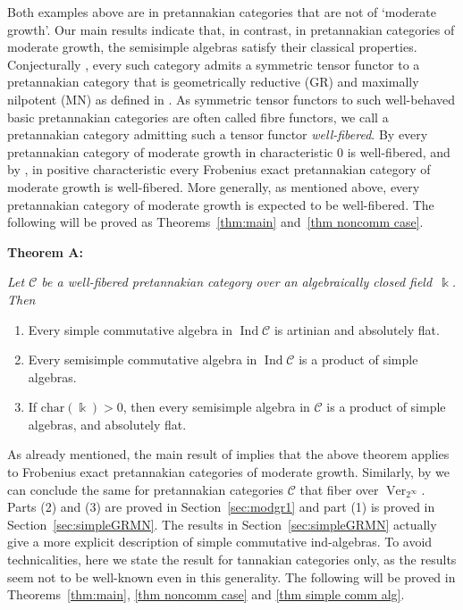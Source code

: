 \documentclass[11pt]{amsart}
\def\Ind{\operatorname{Ind}}
\def\Cs{\mathscr{C}}
\def\cC{\mathscr{C}}
\def\bk{\Bbbk}
\def\Ver{\operatorname{Ver}}
\theoremstyle{definition}
\theoremstyle{remark}
\numberwithin{equation}{section}
\begin{document}
Both examples above are in pretannakian categories that are not of `moderate growth'. Our main results indicate that, in contrast, in pretannakian categories of moderate growth, the semisimple algebras satisfy their classical properties. Conjecturally \cite{BEO, C1}, every such category admits a symmetric tensor functor to a pretannakian category that is geometrically reductive (GR) and maximally nilpotent (MN) as defined in \cite{C1}. As symmetric tensor functors to such well-behaved basic pretannakian categories are often called fibre functors, we call a pretannakian category admitting such a tensor functor \emph{well-fibered}. By \cite{Del90, Del02} every pretannakian category of moderate growth in characteristic 0 is well-fibered, and by \cite{CEO-A}, in positive characteristic every Frobenius exact pretannakian category of moderate growth is well-fibered. More generally, as mentioned above, every pretannakian category of moderate growth is expected to be well-fibered. The following will be proved as Theorems~\ref{thm:main} and~\ref{thm noncomm case}.

\medskip

{\bf Theorem A:} {\em Let $\cC$ be a well-fibered pretannakian category over an algebraically closed field~$\bk$. Then
\begin{enumerate}
    \item Every simple commutative algebra in $\Ind\cC$ is artinian and absolutely flat.
    \item Every semisimple commutative algebra in $\Ind\cC$ is a product of simple algebras.
    \item If $\mathrm{char}(\bk)>0$, then every semisimple algebra in $\cC$ is a product of simple algebras, and absolutely flat.
\end{enumerate}}

\medskip

As already mentioned, the main result of \cite{CEO-A} implies that the above theorem applies to Frobenius exact pretannakian categories of moderate growth. Similarly, by \cite[Thm. 9.2.1 and 9.3.7]{CEO} we can conclude the same for pretannakian categories $\Cs$ that fiber over $\Ver_{2^\infty}$.
Parts (2) and (3) are proved in Section~\ref{sec:modgr1} and part (1) is proved in Section~\ref{sec:simpleGRMN}. The results in Section~\ref{sec:simpleGRMN} actually give a more explicit description of simple commutative ind-algebras. To avoid technicalities, here we state the result for tannakian categories only, as the results seem not to be well-known even in this generality. The following will be proved in Theorems~\ref{thm:main}, \ref{thm noncomm case} and \ref{thm simple comm alg}.
\end{document}
